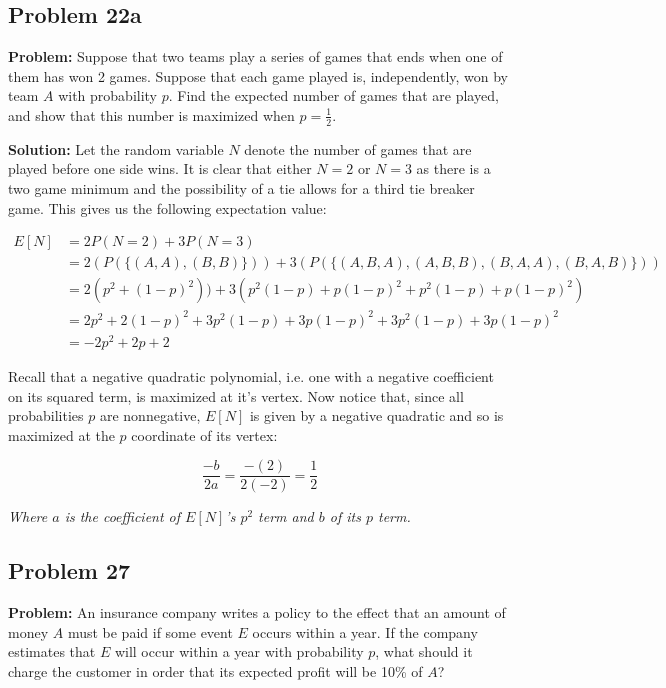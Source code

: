 \documentclass{article}
\begin{document}
\subsection*{Problem 22a}
\noindent\textbf{Problem:} Suppose that two teams play a series of games that ends when one of them has won 2 games. Suppose that each game played is, independently, won by team $A$ with probability $p$. Find the expected number of games that are played, and show that this number is maximized when $p=\frac{1}{2}$.
\bigskip

\noindent\textbf{Solution:} Let the random variable $N$ denote the number of games that are played before one side wins. It is clear that either $N=2$ or $N=3$ as there is a two game minimum and the possibility of a tie allows for a third tie breaker game. This gives us the following expectation value:

\begin{align*}
    E[N]&=2P(N=2)+3P(N=3)\\
    &=2(P(\{(A,A),(B,B)\}))+3(P(\{(A,B,A),(A,B,B),(B,A,A),(B,A,B)\}))\\
    &=2(p^2+(1-p)^2))+3(p^2(1-p)+p(1-p)^2+p^2(1-p)+p(1-p)^2)\\
    &=2p^2+2(1-p)^2+3p^2(1-p)+3p(1-p)^2+3p^2(1-p)+3p(1-p)^2\\
    &=-2p^2+2p+2
\end{align*}

Recall that a negative quadratic polynomial, i.e. one with a negative coefficient on its squared term, is maximized at it's vertex. Now notice that, since all probabilities $p$ are nonnegative, $E[N]$ is given by a negative quadratic and so is maximized at the $p$ coordinate of its vertex:

\begin{equation*}
    \frac{-b}{2a}=\frac{-(2)}{2(-2)}=\frac{1}{2}
\end{equation*}

\textit{Where $a$ is the coefficient of $E[N]$'s $p^2$ term and $b$ of its $p$ term.}

\subsection*{Problem 27}
\noindent\textbf{Problem:} An insurance company writes a policy to the effect that an amount of money $A$ must be paid if some event $E$ occurs within a year. If the company estimates that $E$ will occur within a year with probability $p$, what should it charge the customer in order that its expected profit will be 10\% of $A$?
\bigskip
\end{document}
